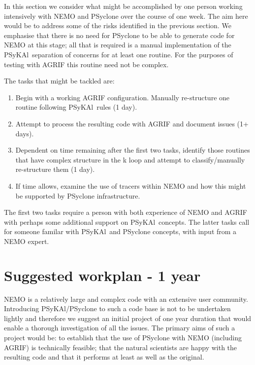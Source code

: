 \documentclass{article}
\newcommand{\psykal}{{PS}y{KA}l}
\begin{document}
In this section we consider what might be accomplished by one person
working intensively with NEMO and PSyclone over the course of one
week. The aim here would be to address some of the risks identified in
the previous section. We emphasise that there is no need for PSyclone
to be able to generate code for NEMO at this stage; all that is
required is a manual implementation of the \psykal\ separation of
concerns for at least one routine. For the purposes of testing with
AGRIF this routine need not be complex. 

The tasks that might be tackled are:
\begin{enumerate}

\item Begin with a working AGRIF configuration. Manually 
 re-structure one routine following \psykal\ rules (1 day).

\item Attempt to process the resulting code with AGRIF and 
 document issues (1+ days).

\item Dependent on time remaining after the first two tasks, identify
  those routines that have complex structure in the k loop and attempt
  to classify/manually re-structure them (1 day).

\item If time allows, examine the use of tracers within NEMO and how
  this might be supported by PSyclone infrastructure.

\end{enumerate}
The first two tasks require a person with both experience of NEMO and
AGRIF with perhaps some additional support on \psykal\ concepts.  The
latter tasks call for someone familar with \psykal\ and PSyclone
concepts, with input from a NEMO expert.

\section{Suggested workplan - 1 year}

NEMO is a relatively large and complex code with an extensive user
community. Introducing \psykal/PSyclone to such a code base is not to
be undertaken lightly and therefore we suggest an initial project of
one year duration that would enable a thorough investigation of all
the issues. The primary aims of such a project would be: to establish
that the use of PSyclone with NEMO (including AGRIF) is technically
feasible; that the natural scientists are happy with the resulting
code and that it performs at least as well as the original.
\end{document}
